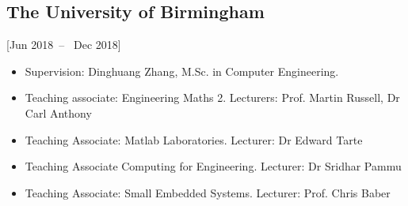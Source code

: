 \documentclass{mycv}
\begin{document}





\subsection{The University of Birmingham}[Jun 2018~--~ Dec 2018]


\begin{itemize}
\item Supervision: Dinghuang Zhang, M.Sc. in Computer Engineering.  %
\item Teaching associate: Engineering Maths 2. Lecturers: Prof. Martin Russell, Dr Carl Anthony 
\item Teaching Associate: Matlab Laboratories. Lecturer: Dr Edward Tarte  
\item Teaching Associate Computing for Engineering. Lecturer: Dr Sridhar Pammu  
\item Teaching Associate: Small Embedded Systems. Lecturer: Prof. Chris Baber   
\end{itemize}
\end{document}
